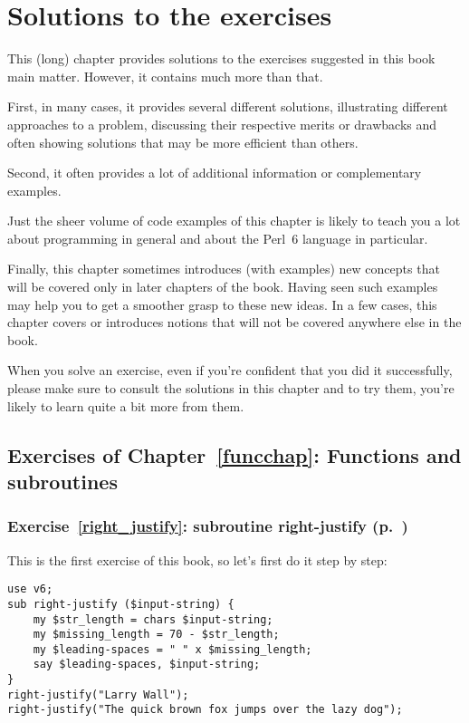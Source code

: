 \chapter{Solutions to the exercises}

This (long) chapter provides solutions to the exercises 
suggested in this book main matter. However, it contains 
much more than that.

First, in many cases, it provides several different solutions, 
illustrating different approaches to a problem, discussing 
their respective merits or drawbacks and often 
showing solutions that may be more efficient than others.

Second, it often provides a lot of additional information 
or complementary examples.

Just the sheer volume of code examples of this chapter is 
likely to teach you a lot about programming in general and 
about the Perl~6 language in particular.

Finally, this chapter sometimes introduces (with examples) new 
concepts that will be covered only in later chapters of the book. 
Having seen such examples may help you to get a smoother 
grasp to these new ideas. In a few cases, this chapter covers 
or introduces notions that will not be covered anywhere else 
in the book.

When you solve an exercise, even if you're confident that you 
did it successfully, please make sure to consult the solutions 
in this chapter and to try them, you're likely to learn quite 
a bit more from them.

\section{Exercises of Chapter~\ref{funcchap}: Functions and subroutines}

\subsection{Exercise~\ref{right_justify}: subroutine right-justify (p.~\pageref{right_justify})}
\label{sol_right_justify}

This is the first exercise of this book, so let's first do it 
step by step:

\begin{verbatim}
use v6;
sub right-justify ($input-string) {
    my $str_length = chars $input-string;
    my $missing_length = 70 - $str_length;
    my $leading-spaces = " " x $missing_length;
    say $leading-spaces, $input-string;
}
right-justify("Larry Wall");
right-justify("The quick brown fox jumps over the lazy dog");
\end{verbatim}

